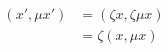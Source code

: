 \documentclass[preview]{standalone}
\begin{document}
\begin{align*}
(x',\mu x')& =(\zeta x, \zeta \mu x)\\ & = \zeta (x, \mu x)
\end{align*}
\end{document}
